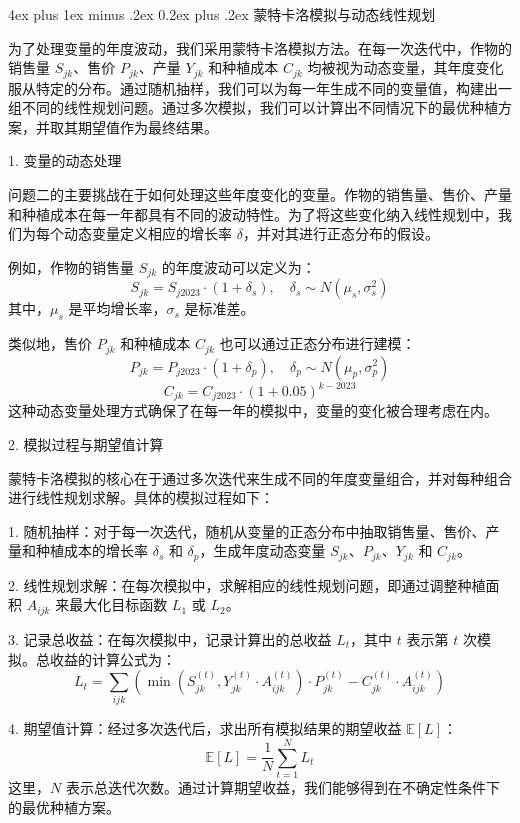 \documentclass[12pt,a4paper]{nmmcm}
\makeatletter
\renewcommand\subsubsection{\@startsection{subsubsection}{3}{1em}%
  {4ex plus 1ex minus .2ex}%
  {0.2ex plus .2ex}%
  {\normalfont\large\bfseries}}
\makeatother
\begin{document}
\subsubsection{蒙特卡洛模拟与动态线性规划}

为了处理变量的年度波动，我们采用蒙特卡洛模拟方法。在每一次迭代中，作物的销售量 $S_{jk}$、售价 $P_{jk}$、产量 $Y_{jk}$ 和种植成本 $C_{jk}$ 均被视为动态变量，其年度变化服从特定的分布。通过随机抽样，我们可以为每一年生成不同的变量值，构建出一组不同的线性规划问题。通过多次模拟，我们可以计算出不同情况下的最优种植方案，并取其期望值作为最终结果。

 1. 变量的动态处理

问题二的主要挑战在于如何处理这些年度变化的变量。作物的销售量、售价、产量和种植成本在每一年都具有不同的波动特性。为了将这些变化纳入线性规划中，我们为每个动态变量定义相应的增长率 $\delta$，并对其进行正态分布的假设。

例如，作物的销售量 $S_{jk}$ 的年度波动可以定义为：
\[
S_{jk} = S_{j2023} \cdot (1 + \delta_s), \quad \delta_s \sim N(\mu_s, \sigma_s^2)
\]
其中，$\mu_s$ 是平均增长率，$\sigma_s$ 是标准差。

类似地，售价 $P_{jk}$ 和种植成本 $C_{jk}$ 也可以通过正态分布进行建模：
\[
P_{jk} = P_{j2023} \cdot (1 + \delta_p), \quad \delta_p \sim N(\mu_p, \sigma_p^2)
\]
\[
C_{jk} = C_{j2023} \cdot (1 + 0.05)^{k-2023}
\]
这种动态变量处理方式确保了在每一年的模拟中，变量的变化被合理考虑在内。

 2. 模拟过程与期望值计算

蒙特卡洛模拟的核心在于通过多次迭代来生成不同的年度变量组合，并对每种组合进行线性规划求解。具体的模拟过程如下：

1. 随机抽样：对于每一次迭代，随机从变量的正态分布中抽取销售量、售价、产量和种植成本的增长率 $\delta_s$ 和 $\delta_p$，生成年度动态变量 $S_{jk}$、$P_{jk}$、$Y_{jk}$ 和 $C_{jk}$。

2. 线性规划求解：在每次模拟中，求解相应的线性规划问题，即通过调整种植面积 $A_{ijk}$ 来最大化目标函数 $L_1$ 或 $L_2$。

3. 记录总收益：在每次模拟中，记录计算出的总收益 $L_t$，其中 $t$ 表示第 $t$ 次模拟。总收益的计算公式为：
   \[
   L_t = \sum_{ijk} \left( \min(S_{jk}^{(t)}, Y_{jk}^{(t)} \cdot A_{ijk}^{(t)}) \cdot P_{jk}^{(t)} - C_{jk}^{(t)} \cdot A_{ijk}^{(t)} \right)
   \]

4. 期望值计算：经过多次迭代后，求出所有模拟结果的期望收益 $\mathbb{E}[L]$：
   \[
   \mathbb{E}[L] = \frac{1}{N} \sum_{t=1}^{N} L_t
   \]
   这里，$N$ 表示总迭代次数。通过计算期望收益，我们能够得到在不确定性条件下的最优种植方案。
\end{document}
